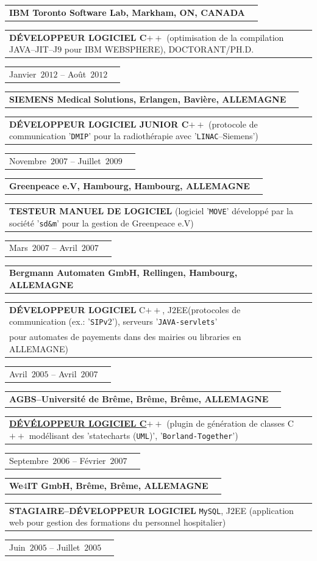 \documentclass[9pt,a4paper]{article} %
\makeatletter
\newcommand{\headerrow}[2]
{\begin{tabular*}{\linewidth}{l@{\extracolsep{\fill}}r}
	#1 &
	#2 \\
\end{tabular*}}
\newcommand{\headerrowONE}[1]{\headerrow{#1}{}}
\newcommand{\cplusplus}{C$++$\xspace}
\newcommand{\jtwoee}{J$2$EE\xspace}
\newcommand{\mysql}{\texttt{MySQL}\xspace}
\newcommand{\cvitemdate}[2]{#1~$#2$\xspace}
\newcommand{\cvitempositionheld}[1]{\textbf{#1}\xspace}
\makeatother
\begin{document}
\headerrowONE{\textbf{IBM Toronto Software Lab, Markham, ON, CANADA}}	
\headerrowONE{\cvitempositionheld{DÉVELOPPEUR LOGICIEL \cplusplus} (optimisation de la compilation JAVA--JIT--J$9$
	pour IBM WEBSPHERE), DOCTORANT/PH.D.}
\headerrowONE{\cvitemdate{Janvier}{2012} -- \cvitemdate{Août}{2012}}	

\vspace{0.3em}

\headerrowONE{\textbf{SIEMENS Medical Solutions, Erlangen, Bavière, ALLEMAGNE}}	
\headerrowONE{\cvitempositionheld{DÉVELOPPEUR LOGICIEL JUNIOR \cplusplus} (protocole 
de communication '\texttt{DMIP}' pour la radiothérapie avec '\texttt{LINAC}--Siemens')}
\headerrowONE{\cvitemdate{Novembre}{2007} -- \cvitemdate{Juillet}{2009}}	
	
\vspace{0.3em}

\headerrowONE{\textbf{Greenpeace e.V, Hambourg, Hambourg, ALLEMAGNE}}	
\headerrowONE{\cvitempositionheld{TESTEUR MANUEL DE LOGICIEL} 
(logiciel '\texttt{MOVE}' développé par la société '\texttt{sd\&m}' pour la gestion de Greenpeace e.V)}
\headerrowONE{\cvitemdate{Mars}{2007} -- \cvitemdate{Avril}{2007}}	

\vspace{0.3em}

\headerrowONE{\textbf{Bergmann Automaten GmbH, Rellingen, Hambourg, ALLEMAGNE}}	
\headerrowONE{\cvitempositionheld{DÉVELOPPEUR LOGICIEL} \cplusplus, \jtwoee (protocoles de
communication (ex.: '\texttt{SIPv$2$}'), serveurs '\texttt{JAVA-servlets}'\\
 pour automates de payements dans des mairies ou libraries en ALLEMAGNE)}
\headerrowONE{\cvitemdate{Avril}{2005} -- \cvitemdate{Avril}{2007}}	
	
\vspace{0.3em}

\headerrowONE{\textbf{AGBS--Université de Brême, Brême, Brême, ALLEMAGNE}}	
\headerrowONE{\href{http://www.informatik.uni-bremen.de/agbs/jp/papers/peleska_et_al_soqua2006.pdf}
	{\cvitempositionheld{DÉVÉLOPPEUR LOGICIEL \cplusplus}} (plugin de 
génération de classes \cplusplus modélisant des 'statecharts (\texttt{UML})', '\texttt{Borland-Together}')}
\headerrowONE{\cvitemdate{Septembre}{2006} -- \cvitemdate{Février}{2007}}	

\vspace{0.3em}

\headerrowONE{\textbf{We$4$IT GmbH, Brême, Brême, ALLEMAGNE}}	
\headerrowONE{\cvitempositionheld{STAGIAIRE--DÉVELOPPEUR LOGICIEL} \mysql, \jtwoee
(application web pour gestion des formations du personnel hospitalier)}
\headerrowONE{\cvitemdate{Juin}{2005} -- \cvitemdate{Juillet}{2005}}
\end{document}
